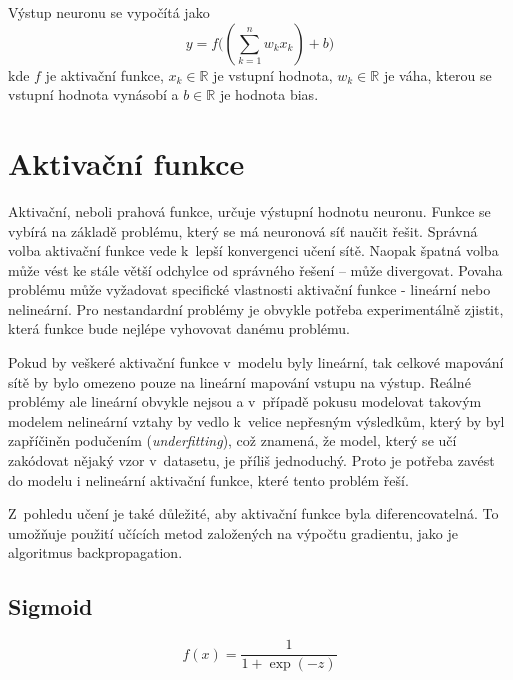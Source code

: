 Výstup neuronu se vypočítá jako
\begin{equation}
	y = f\Big((\sum_{k=1}^n w_kx_k) + b\Big)
\end{equation}
kde $f$ je aktivační funkce, $x_k \in \mathbb{R}$ je vstupní hodnota, $w_k \in \mathbb{R}$ je váha, kterou se vstupní hodnota vynásobí a $b \in \mathbb{R}$ je hodnota bias.


\section{Aktivační funkce}
Aktivační, neboli prahová funkce, určuje výstupní hodnotu neuronu. Funkce se vybírá na základě problému, který se má neuronová síť naučit řešit. Správná volba aktivační funkce vede k~lepší konvergenci učení sítě. Naopak špatná volba může vést ke stále větší odchylce od správného řešení -- může divergovat. Povaha problému může vyžadovat specifické vlastnosti aktivační funkce - lineární nebo nelineární. Pro nestandardní problémy je obvykle potřeba experimentálně zjistit, která funkce bude nejlépe vyhovovat danému problému. 

Pokud by veškeré aktivační funkce v~modelu byly lineární, tak celkové mapování sítě by bylo omezeno pouze na lineární mapování vstupu na výstup. Reálné problémy ale lineární obvykle nejsou a v~případě pokusu modelovat takovým modelem nelineární vztahy by vedlo k~velice nepřesným výsledkům, který by byl zapříčiněn podučením (\textit{underfitting}), což znamená, že model, který se učí zakódovat nějaký vzor v~datasetu, je příliš jednoduchý. Proto je potřeba zavést do modelu i nelineární aktivační funkce, které tento problém řeší\cite[p.~77--78]{mitdeeplearning_small}.

Z~pohledu učení je také důležité, aby aktivační funkce byla diferencovatelná. To umožňuje použití učících metod založených na výpočtu gradientu, jako je algoritmus backpropagation.



\subsection*{Sigmoid}
\begin{equation}
  f(x) = \frac{1}{1+\exp(-z)}
\end{equation}


